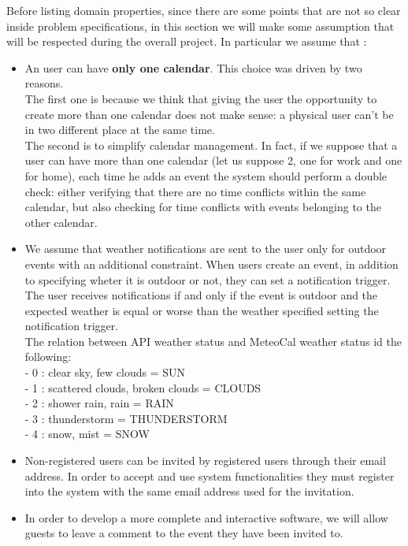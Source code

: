 \documentclass[12pt]{book}
\begin{document}
Before listing domain properties, since there are some points that are not so clear inside problem specifications, in this section we will make some assumption that will be respected during the overall project. In particular we assume that : 
\begin{itemize}
	\item An user can have \textbf{only one calendar}. This choice was driven by two reasons.\\ The first one is because we think that giving the user the opportunity to create more than one calendar does not make sense: a physical user can't be in two different place at the same time. \\The second is to simplify calendar management. In fact, if we suppose that a user can have more than one calendar (let us suppose 2, one for work and one for home), each time he adds an event the system should perform a double check: either verifying that there are no time conflicts within the same calendar, but also checking for time conflicts with events belonging to the other calendar.\\ 
	\item We assume that weather notifications are sent to the user only for outdoor events with an additional constraint. When users create an event, in addition to specifying wheter it is outdoor or not, they can set a notification trigger.\\ 
	The user receives notifications if and only if the event is outdoor and the expected weather is equal or worse than the weather specified setting the notification trigger.  \\ 
	The relation between API weather status and MeteoCal weather status id the following: \\
	- 0 : clear sky, few clouds = SUN\\
	- 1 : scattered clouds, broken clouds = CLOUDS\\
	- 2 : shower rain, rain = RAIN\\
	- 3 : thunderstorm = THUNDERSTORM \\
	- 4 : snow, mist = SNOW\\
	\item Non-registered users can be invited by registered users through their email address. In order to accept and use system functionalities they must register into the system with the same email address used for the invitation.  \\
	\item In order to develop a more complete and interactive software, we will allow guests to leave a comment to the event they have been invited to. \\

\end{itemize}
\end{document}
